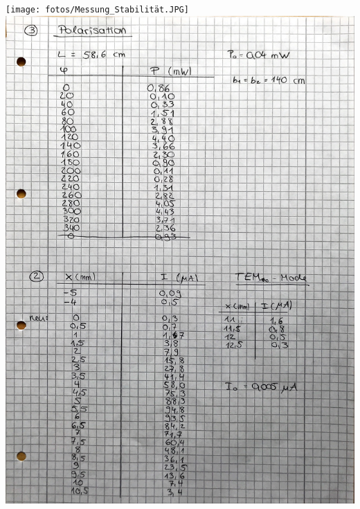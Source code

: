 



\maketitle
\tableofcontents
\newpage






\newpage
\printbibliography

\texttt{[image: fotos/Messung\_Stabilität.JPG]}
\includegraphics[width=\textwidth]{fotos/Messung_Polarisation_TEM00.JPG}
